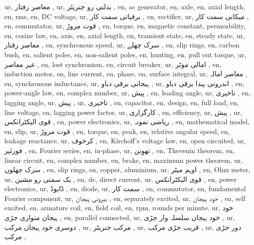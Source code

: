 ur, معاصر رفتار ,
ur, بدلتی رو جنریٹر ,
en, ac generator,
en, axle,
en, axial length,
en, rms,
en, DC voltage,
ur, برقیاتی سمت کار ,
en, rectifier,
ur, میکانی سمت کار ,
en, commutator,
ur, قوت مروڑ ,
en, torque,
en, magnetic constant, permeability,
en, cosine law,
en, axis,
en, axial length,
en, transient state,
en, steady state,
ur, معاصر رفتار ,
en, synchronous speed,
ur, سرک چھلے ,
en, slip rings,
en, carbon bush,
en, salient poles,
en, non-salient poles,
en, hunting,
en, pull out torque,
ur, غیر معاصر ,
en, lost synchronism,
en, circuit breaker,
ur, امالی موٹر ,
en, induction motor,
en, line current,
en, phase,
en, surface integral,
ur, معاصر امالہ ,
en, synchronous inductance,
ur, ہیجانی برقی دباو ,
ur, اندرونی پیدا برقی دباو ,
en, power-angle law,
en, complex number,
ur, پیش ,
en, leading angle,
ur, تاخیری ,
en, lagging angle,
ur, پیش ,
ur, تاخیری ,
en, capacitor,
en, design,
en, full load,
en, line voltage,
en, lagging power factor,
ur, کارگزاری ,
en, efficiency,
ur, پیش ,
ur, قوی الیکٹرانکس ,
en, power electronics,
ur, ریاضی نمونہ ,
en, mathematical model,
en, slip,
ur, قوت مروڑ ,
en, torque,
en, peak,
en, relative angular speed,
en, leakage reactance,
ur, کرخوف ,
en, Kirchoff's voltage law,
en, open circuited,
ur, فورئیر ,
en, Fourier series,
en, in-phase,
ur, تھوِنن ,
en, Thevenin theorem,
en, linear circuit,
en, complex number,
en, brake,
en, maximum power theorem,
ur, سرک چھلوں ,
en, slip rings,
en, copper, aluminium,
ur, اوہم میٹر ,
en, Ohm meter,
ur, یک سمتی رو مشین ,
en, dc, direct current,
ur, قوی الیکٹرانکس ,
en, power electronics,
ur, ڈایوڈ ,
en, diode,
ur, سمت کار ,
en, commutator,
en, fundamental Fourier component,
ur, بیرونی ہیجان ,
en, separately excited,
ur, خود ہیجان ,
en, self excited,
en, armature coil,
en, field coil,
en, rpm, rounds per minute,
ur, خود ہیجان متوازی جڑی ,
en, parallel connected,
ur, خود ہیجان سلسلہ وار جڑی ,
ur, دوسری خود ہیجان مرکب ,
ur, مرکب جنریٹر ,
ur, قریب جڑی مرکب ,
ur, دور جڑی مرکب ,
